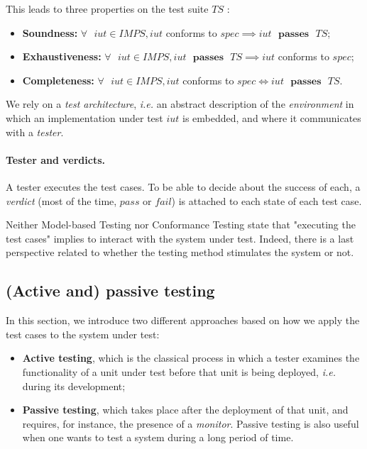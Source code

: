 This leads to three properties on the test suite $TS$
\cite{ltsTretmans}:

\begin{itemize}
\item \textbf{Soundness:} $\forall \text{ } iut \in IMPS, iut$
conforms to $spec \implies iut \text{ } \mathbf{passes} \text{ }
TS$;

\item \textbf{Exhaustiveness:} $\forall \text{ } iut \in IMPS,
iut \text{ } \mathbf{passes} \text{ } TS \implies iut$ conforms
to $spec$;

\item \textbf{Completeness:} $\forall \text{ } iut \in IMPS, iut$
conforms to $spec \Leftrightarrow iut \text{ } \mathbf{passes}
\text{ } TS$.
\end{itemize}

We rely on a \textit{test architecture}, \emph{i.e.} an abstract
description of the \textit{environment} in which an
implementation under test $iut$ is embedded, and where it
communicates with a \textit{tester}.

\paragraph{Tester and verdicts.} A tester executes the test
cases. To be able to decide about the success of each, a
\textit{verdict} (most of the time, $pass$ or $fail$) is attached
to each state of each test case.

Neither Model-based Testing nor Conformance Testing state that
"executing the test cases" implies to interact with the system
under test. Indeed, there is a last perspective related to
whether the testing method stimulates the system or not.

\subsection{(Active and) passive testing}
\label{sec:related:testing:active-passive}

In this section, we introduce two different approaches based on
how we apply the test cases to the system under test:

\begin{itemize}
    \item \textbf{Active testing}, which is the classical process
        in which a tester examines the functionality of a unit
        under test before that unit is being deployed, \emph{i.e.}
        during its development;

    \item \textbf{Passive testing}, which takes place after the
        deployment of that unit, and requires, for instance, the
        presence of a \textit{monitor}. Passive testing is also
        useful when one wants to test a system during a long
        period of time.
\end{itemize}

